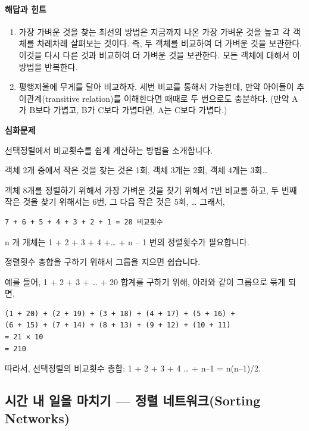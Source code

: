 \documentclass[]{article}
\begin{document}
\mbox{}\paragraph{해답과 힌트}\label{section-111}

\begin{enumerate}
\item
  가장 가벼운 것을 찾는 최선의 방법은 지금까지 나온 가장 가벼운 것을
  높고 각 객체를 차례차례 살펴보는 것이다. 즉, 두 객체를 비교하여 더
  가벼운 것을 보관한다. 이것을 다시 다른 것과 비교하여 더 가벼운 것을
  보관한다. 모든 객체에 대해서 이 방법을 반복한다.
\item
  평행저울에 무게를 달아 비교하자. 세번 비교를 통해서 가능한데, 만약
  아이들이 추이관계(transitive relation)를 이해한다면 때때로 두 번으로도
  충분하다. (만약 A가 B보다 가볍고, B가 C보다 가볍다면, A는 C보다
  가볍다.)
\end{enumerate}

\textbf{심화문제}

선택정렬에서 비교횟수를 쉽게 계산하는 방법을 소개합니다.

객체 2개 중에서 작은 것을 찾는 것은 1회, 객체 3개는 2회, 객체 4개는
3회\ldots{}

객체 8개를 정렬하기 위해서 가장 가벼운 것을 찾기 위해서 7번 비교를 하고,
두 번째 작은 것을 찾기 위해서는 6번, 그 다음 작은 것은 5회, \ldots{}
그래서,

\begin{verbatim}
7 + 6 + 5 + 4 + 3 + 2 + 1 = 28 비교횟수
\end{verbatim}

n 개 개체는 1 + 2 + 3 + 4 +\ldots{} + n -- 1 번의 정렬횟수가 필요합니다.

정렬횟수 총합을 구하기 위해서 그룹을 지으면 쉽습니다.

예를 들어, 1 + 2 + 3 + \ldots{} + 20 합계를 구하기 위해, 아래와 같이
그룹으로 묶게 되면,

\begin{verbatim}
(1 + 20) + (2 + 19) + (3 + 18) + (4 + 17) + (5 + 16) +
(6 + 15) + (7 + 14) + (8 + 13) + (9 + 12) + (10 + 11)
= 21 × 10
= 210
\end{verbatim}

따라서, 선택정렬의 비교횟수 총합: 1 + 2 + 3 + 4 \ldots{} + n--1 =
n(n--1)/2.

\subsection{시간 내 일을 마치기 --- 정렬 네트워크(Sorting
Networks)}\label{mdash--sorting-networks}
\end{document}
